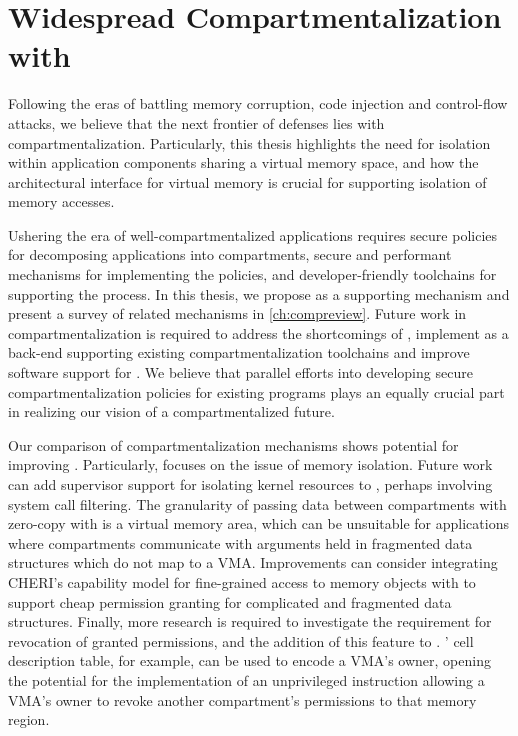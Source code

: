 \section{Widespread Compartmentalization with \seccells}
\label{sec:conclusion:seccells}
Following the eras of battling memory corruption, code injection and 
control-flow attacks,
we believe that the next frontier of defenses lies with compartmentalization.
Particularly, this thesis highlights the need for isolation within
application components sharing a virtual memory space, and how the
architectural interface for virtual memory is crucial for supporting
isolation of memory accesses.

Ushering the era of well-compartmentalized applications requires 
secure policies for decomposing applications into compartments,
secure and performant mechanisms for implementing the policies, and
developer-friendly toolchains for supporting the process.
In this thesis, we propose \seccells as a supporting mechanism and
present a survey of related mechanisms in \autoref{ch:compreview}.
Future work in compartmentalization is required to address the
shortcomings of \seccells, implement \seccells as a back-end supporting
existing compartmentalization toolchains and
improve software support for \seccells.
We believe that parallel efforts into developing secure compartmentalization
policies for existing programs plays an equally crucial part in realizing
our vision of a compartmentalized future.

Our comparison of compartmentalization mechanisms shows potential
for improving \seccells.
Particularly, \seccells focuses on the issue of memory isolation.
Future work can add supervisor support for isolating kernel resources
to \seccells, perhaps involving system call filtering.
The granularity of passing data between compartments with zero-copy with
\seccells is a virtual memory area, which can be unsuitable for 
applications where compartments communicate with arguments held in 
fragmented data structures which do not map to a VMA.
Improvements can consider integrating CHERI's capability model for
fine-grained access to memory objects with \seccells to support cheap 
permission granting for complicated and fragmented data structures.
Finally, more research is required to investigate the requirement for
revocation of granted permissions, and the addition of this feature
to \seccells.
\seccells' cell description table, for example, can be used to encode
a VMA's owner, opening the potential for the implementation of an
unprivileged instruction allowing a VMA's owner to revoke another
compartment's permissions to that memory region.

